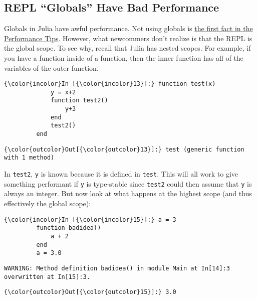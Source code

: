 \documentclass[11pt]{article}
\begin{document}
    \subsection{REPL ``Globals'' Have Bad
Performance}\label{repl-globals-have-bad-performance}

    Globals in Julia have awful performance. Not using globals is
\href{http://docs.julialang.org/en/release-0.5/manual/performance-tips/}{the
first fact in the Performance Tips}. However, what newcommers don't
realize is that the REPL is the global scope. To see why, recall that
Julia has nested scopes. For example, if you have a function inside of a
function, then the inner function has all of the variables of the outer
function.

    \begin{Verbatim}[commandchars=\\\{\}]
{\color{incolor}In [{\color{incolor}13}]:} function test(x)
             y = x+2
             function test2()
                 y+3
             end
             test2()
         end
\end{Verbatim}

            \begin{Verbatim}[commandchars=\\\{\}]
{\color{outcolor}Out[{\color{outcolor}13}]:} test (generic function with 1 method)
\end{Verbatim}
        
    In \texttt{test2}, \texttt{y} is known because it is defined in
\texttt{test}. This will all work to give something performant if
\texttt{y} is type-stable since \texttt{test2} could then assume that
\texttt{y} is always an integer. But now look at what happens at the
highest scope (and thus effectively the global scope):

    \begin{Verbatim}[commandchars=\\\{\}]
{\color{incolor}In [{\color{incolor}15}]:} a = 3
         function badidea()
             a + 2
         end
         a = 3.0
\end{Verbatim}

    \begin{Verbatim}[commandchars=\\\{\}]
WARNING: Method definition badidea() in module Main at In[14]:3 overwritten at In[15]:3.

    \end{Verbatim}

            \begin{Verbatim}[commandchars=\\\{\}]
{\color{outcolor}Out[{\color{outcolor}15}]:} 3.0
\end{Verbatim}
        
\end{document}
